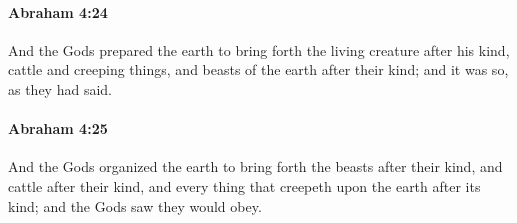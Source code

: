 
		\paragraph{Abraham 4:24} %
			\label{ABRAHAM-4-24}

			And the Gods prepared the earth to bring forth the living creature after his kind, cattle and creeping things, and beasts of the earth after their kind; and it was so, as they had said.


		\paragraph{Abraham 4:25} %
			\label{ABRAHAM-4-25}

			And the Gods organized the earth to bring forth the beasts after their kind, and cattle after their kind, and every thing that creepeth upon the earth after its kind; and the Gods saw they would obey.

